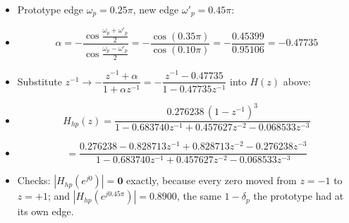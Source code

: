 \begin{itemize}
  \item Prototype edge $\omega_p=0.25\pi$, new edge $\omega'_p=0.45\pi$:
  \item[] \[ \alpha=-\frac{\cos\frac{\omega_p+\omega'_p}{2}}
                          {\cos\frac{\omega_p-\omega'_p}{2}}
             =-\frac{\cos(0.35\pi)}{\cos(0.10\pi)}
             =-\frac{0.45399}{0.95106}=\mathbf{-0.47735} \]
  \item Substitute $z^{-1}\to-\dfrac{z^{-1}+\alpha}{1+\alpha z^{-1}}
        =-\dfrac{z^{-1}-0.47735}{1-0.47735z^{-1}}$ into $H(z)$ above:
  \item[] \[ \boxed{\,H_{hp}(z)=\frac{0.276238\,(1-z^{-1})^3}
             {1-0.683740z^{-1}+0.457627z^{-2}-0.068533z^{-3}}\,} \]
  \item[] \[ =\frac{0.276238-0.828713z^{-1}+0.828713z^{-2}-0.276238z^{-3}}
                   {1-0.683740z^{-1}+0.457627z^{-2}-0.068533z^{-3}} \]
  \item Checks: $|H_{hp}(e^{j0})|=\mathbf{0}$ exactly, because every zero moved from
        $z=-1$ to $z=+1$; and $|H_{hp}(e^{j0.45\pi})|=\mathbf{0.8900}$, the same
        $1-\delta_p$ the prototype had at its own edge. 
\end{itemize}


